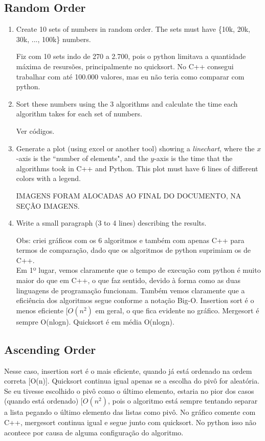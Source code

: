 \documentclass{article}
\begin{document}
	\subsection{Random Order}
	\begin{enumerate}
		\item Create 10 sets of numbers in random order. The sets must have \{10k, 20k, 30k, ..., 100k\} numbers.
		
		Fiz com 10 sets indo de 270 a 2.700, pois o python limitava a quantidade máxima de resursões, principalmente no quicksort. No C++ consegui trabalhar com até 100.000 valores, mas eu não teria como comparar com python.
		
		\item Sort these numbers using the 3 algorithms and calculate the time each algorithm takes for each set of numbers.
		
		Ver códigos.
		
		\item Generate a plot (using excel or another tool) showing a \emph{linechart}, where the $x$-axis is the ``number of elements", and the $y$-axis is the time that the algorithms took in C++ and Python. This plot must have 6 lines of different colors with a legend.
		
		IMAGENS FORAM ALOCADAS AO FINAL DO DOCUMENTO, NA SEÇÃO IMAGENS.
		
		\item Write a small paragraph (3 to 4 lines) describing the results.
		
		Obs: criei gráficos com os 6 algoritmos e também com apenas C++ para termos de comparação, dado que os algoritmos de python suprimiam os de C++.\\
		Em 1º lugar, vemos claramente que o tempo de execução com python é muito maior do que em C++, o que faz sentido, devido à forma como as duas linguagens de programação funcionam. Também vemos claramente que a eficiência dos algoritmos segue conforme a notação Big-O. 
		Insertion sort é o menos eficiente $[O(n^2)$ em geral, o que fica evidente no gráfico. Mergesort é sempre O(nlogn). Quicksort é em média O(nlogn).
		
	\end{enumerate}
	
	\subsection{Ascending Order}
	
	
	
	Nesse caso, insertion sort é o mais eficiente, quando já está ordenado na ordem correta [O(n)]. Quicksort continua igual apenas se a escolha do pivô for aleatória. Se eu tivesse escolhido o pivô como o último elemento, estaria no pior dos casos (quando está ordenado) $[O(n^2)$, pois o algoritmo está sempre tentando separar a lista pegando o último elemento das listas como pivô. No gráfico comente com C++, mergesort continua igual e segue junto com quicksort. No python isso não acontece por causa de alguma configuração do algoritmo.
	
\end{document}
